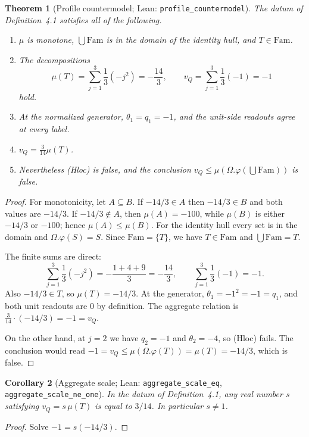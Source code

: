 \documentclass[11pt]{article}
\newcommand{\Fam}{\mathrm{Fam}}
\newtheorem{theorem}{Theorem}[section]
\newtheorem{corollary}[theorem]{Corollary}
\theoremstyle{definition}
\begin{document}
\begin{theorem}[Profile countermodel;
Lean: \texttt{profile\_countermodel}]
The datum of Definition~4.1 satisfies all of the following.
\begin{enumerate}[leftmargin=*]
\item $\mu$ is monotone, $\bigcup\Fam$ is in the domain of the
identity hull, and $T\in\Fam$.
\item The decompositions
\[
\mu(T)=\sum_{j=1}^{3}\frac13(-j^2)=-\frac{14}{3},
\qquad
v_Q=\sum_{j=1}^{3}\frac13(-1)=-1
\]
hold.
\item At the normalized generator, $\theta_1=q_1=-1$, and the
unit-side readouts agree at every label.
\item $v_Q=\frac{3}{14}\mu(T)$.
\item Nevertheless (Hloc) is false, and the conclusion
$v_Q\leq\mu(\Omega.\varphi(\bigcup\Fam))$ is false.
\end{enumerate}
\end{theorem}

\begin{proof}
For monotonicity, let $A\subseteq B$.  If $-14/3\in A$ then
$-14/3\in B$ and both values are $-14/3$.  If
$-14/3\notin A$, then $\mu(A)=-100$, while $\mu(B)$ is either
$-14/3$ or $-100$; hence $\mu(A)\leq\mu(B)$.  For the identity
hull every set is in the domain and $\Omega.\varphi(S)=S$.
Since $\Fam=\{T\}$, we have $T\in\Fam$ and
$\bigcup\Fam=T$.

The finite sums are direct:
\[
\sum_{j=1}^{3}\frac13(-j^2)
 =-\frac{1+4+9}{3}=-\frac{14}{3},
\qquad
\sum_{j=1}^{3}\frac13(-1)=-1.
\]
Also $-14/3\in T$, so $\mu(T)=-14/3$.  At the generator,
$\theta_1=-1^2=-1=q_1$, and both unit readouts are $0$ by
definition.  The aggregate relation is
$\frac{3}{14}\cdot(-14/3)=-1=v_Q$.

On the other hand, at $j=2$ we have $q_2=-1$ and
$\theta_2=-4$, so (Hloc) fails.  The conclusion would read
$-1=v_Q\leq\mu(\Omega.\varphi(T))=\mu(T)=-14/3$, which is
false.
\end{proof}

\begin{corollary}[Aggregate scale;
Lean: \texttt{aggregate\_scale\_eq},
\texttt{aggregate\_scale\_ne\_one}]
In the datum of Definition~4.1, any real number $s$ satisfying
$v_Q=s\,\mu(T)$ is equal to $3/14$.  In particular $s\neq1$.
\end{corollary}

\begin{proof}
Solve $-1=s(-14/3)$.
\end{proof}
\end{document}
